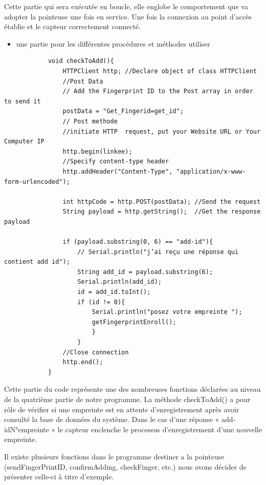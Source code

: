 Cette partie qui sera exécutée en boucle, elle englobe le comportement que va 
adopter la pointeuse une fois en service. Une fois la connexion au point d’accès 
établie et le capteur correctement connecté. 
    
    \begin{itemize}
        \item[\textbullet] une partie pour les différentes procédures et méthodes utiliser 
    \end{itemize}
    \begin{verbatim}
            void checkToAdd(){
                HTTPClient http; //Declare object of class HTTPClient
                //Post Data
                // Add the Fingerprint ID to the Post array in order to send it 
                postData = "Get_Fingerid=get_id"; 
                // Post methode
                //initiate HTTP  request, put your Website URL or Your Computer IP
                http.begin(linkee);                                              
                //Specify content-type header
                http.addHeader("Content-Type", "application/x-www-form-urlencoded"); 
        
                int httpCode = http.POST(postData); //Send the request
                String payload = http.getString();  //Get the response payload
        
                if (payload.substring(0, 6) == "add-id"){
                    // Serial.println("j’ai reçu une réponse qui contient add id");
                    String add_id = payload.substring(6);
                    Serial.println(add_id);
                    id = add_id.toInt();
                    if (id != 0){
                        Serial.println("posez votre empreinte ");
                        getFingerprintEnroll();
                        }
                    }
                //Close connection
                http.end(); 
            }
    \end{verbatim}

Cette partie du code représente une des nombreuses fonctions déclarées au niveau 
de la quatrième partie de notre programme. La méthode checkToAdd() a pour rôle 
de vérifier si une empreinte est en attente d’enregistrement après avoir 
consulté la base de données du système. Dans le cas d’une réponse 
« add-idN°empreinte » le capteur enclenche le processus d’enregistrement d’une 
nouvelle empreinte.

Il existe plusieurs fonctions dans le programme destiner a la pointeuse 
(sendFingerPrintID, confirmAdding, checkFinger, etc.) nous avons décider 
de présenter celle-ci à titre d’exemple.
    

